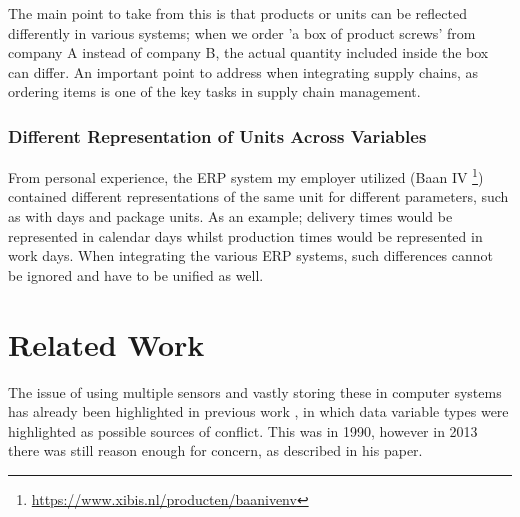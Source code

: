 \documentclass[sigchi, nonacm]{acmart}
\begin{document}
The main point to take from this is that products or units can be reflected differently in various systems; when we order 'a box of product screws' from company A instead of company B, the actual quantity included inside the box can differ. An important point to address when integrating supply chains, as ordering items is one of the key tasks in supply chain management.

\subsubsection{Different Representation of Units Across Variables}
From personal experience, the ERP system my employer utilized (Baan IV \footnote{\url{https://www.xibis.nl/producten/baanivenv}}) contained different representations of the same unit for different parameters, such as with days and package units. As an example; delivery times would be represented in calendar days whilst production times would be represented in work days. When integrating the various ERP systems, such differences cannot be ignored and have to be unified as well.

\section{Related Work}
The issue of using multiple sensors and vastly storing these in computer systems has already been highlighted in previous work \cite{waltz1990multisensor}, in which data variable types were highlighted as possible sources of conflict. This was in 1990, however in 2013 there was still reason enough for concern, as \cite{foster2013quantities} described in his paper.
\end{document}
